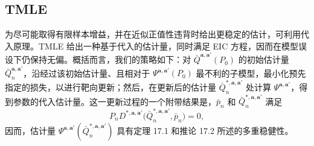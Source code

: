 \subsection{TMLE}

为尽可能取得有限样本增益，并在近似正值性违背时给出更稳定的估计，可利用代入原理。TMLE 给出一种基于代入的估计量，同时满足 EIC 方程，因而在模型误设下仍保持无偏。概括而言，我们的策略如下：对 $\bar Q^{\mathbf a,\mathbf a'}(P_0)$ 的初始估计量 $\bar Q_n^{\mathbf a,\mathbf a'}$，沿经过该初始估计量、且相对于 $\Psi^{\mathbf a,\mathbf a'}(P_0)$ 最不利的子模型，最小化预先指定的损失，以进行靶向更新；然后，在更新后的估计量 $\bar Q_n^{*,\mathbf a,\mathbf a'}$ 处计算 $\Psi^{\mathbf a,\mathbf a'}$，得到参数的代入估计量。这一更新过程的一个附带结果是，$\bar p_n$ 和 $\bar Q_n^{*,\mathbf a,\mathbf a'}$ 满足
\[
 P_nD^{*,\mathbf a,\mathbf a'}\bigl(\bar Q_n^{*,\mathbf a,\mathbf a'},\bar p_n\bigr)=0,
\]
因而，估计量 $\Psi^{\mathbf a,\mathbf a'}(\bar Q_n^{*,\mathbf a,\mathbf a'})$ 具有定理 17.1 和推论 17.2 所述的多重稳健性。

